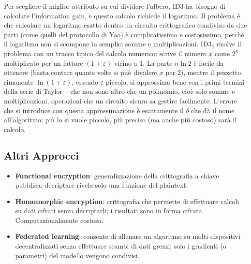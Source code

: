 \documentclass[a4paper,11pt]{article}
\begin{document}
\begin{nota}
Per scegliere il miglior attributo su cui dividere l'albero, ID3 ha bisogno di calcolare l'information gain, e questo calcolo richiede il logaritmo. Il problema è che calcolare un logaritmo esatto dentro un circuito crittografico condiviso da due parti (come quelli del protocollo di Yao) è complicatissimo e costosissimo, perché il logaritmo non si scompone in semplici somme e moltiplicazioni. ID3$_\delta$ risolve il problema con un trucco tipico del calcolo numerico: scrive il numero $x$ come $2^n$ moltiplicato per un fattore $(1+\varepsilon)$ vicino a 1. La parte $n \ln 2$ è facile da ottenere (basta contare quante volte si può dividere $x$ per 2), mentre il pezzetto rimanente $\ln(1+\varepsilon)$, essendo $\varepsilon$ piccolo, si approssima bene con i primi termini della serie di Taylor -- che non sono altro che un polinomio, cioè solo somme e moltiplicazioni, operazioni che un circuito sicuro sa gestire facilmente. L'errore che si introduce con questa approssimazione è esattamente il $\delta$ che dà il nome all'algoritmo: più lo si vuole piccolo, più preciso (ma anche più costoso) sarà il calcolo.
\end{nota}

\subsection{Altri Approcci}

\begin{itemize}
  \item \textbf{Functional encryption}: generalizzazione della crittografia a chiave pubblica; decriptare rivela solo una funzione del plaintext.
  \item \textbf{Homomorphic encryption}: crittografia che permette di effettuare calcoli su dati cifrati senza decriptarli; i risultati sono in forma cifrata. Computazionalmente costosa.
  \item \textbf{Federated learning}: consente di allenare un algoritmo su molti dispositivi decentralizzati senza effettuare scambi di dati grezzi; solo i gradienti (o parametri) del modello vengono condivisi.
\end{itemize}
\end{document}

